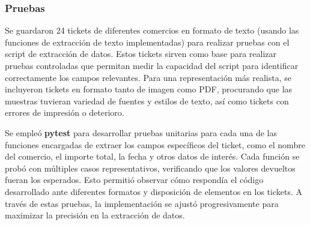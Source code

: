 \subsubsection{Pruebas}
Se guardaron 24 tickets de diferentes comercios en formato de texto (usando las funciones de extracción de texto implementadas) para realizar pruebas con el script de extracción de datos. Estos tickets sirven como base para realizar pruebas controladas que permitan medir la capacidad del script para identificar correctamente los campos relevantes. Para una representación más realista, se incluyeron tickets en formato tanto de imagen como PDF, procurando que las muestras tuvieran variedad de fuentes y estilos de texto, así como tickets con errores de impresión o deterioro.

Se empleó \textbf{pytest} para desarrollar pruebas unitarias para cada una de las funciones encargadas de extraer los campos específicos del ticket, como el nombre del comercio, el importe total, la fecha y otros datos de interés. Cada función se probó con múltiples casos representativos, verificando que los valores devueltos fueran los esperados. Esto permitió observar cómo respondía el código desarrollado ante diferentes formatos y disposición de elementos en los tickets. A través de estas pruebas, la implementación se ajustó progresivamente para maximizar la precisión en la extracción de datos.

